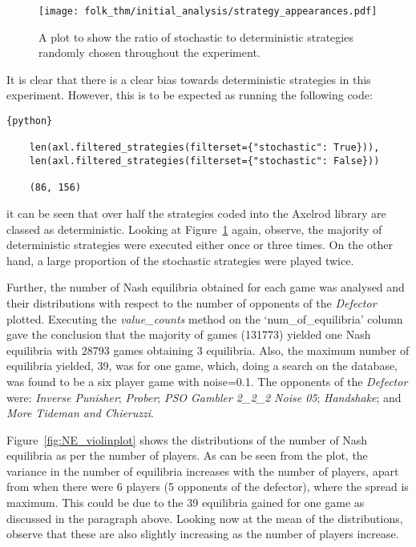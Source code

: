 \begin{figure}
    \centering
    \texttt{[image: folk\_thm/initial\_analysis/strategy\_appearances.pdf]}
    \caption{A plot to show the ratio of stochastic to deterministic strategies randomly chosen throughout the experiment.}\label{fig:stochastic_chart}
\end{figure}

It is clear that there is a clear bias towards deterministic strategies
in this experiment. However, this is to be expected as running the following
code:
\begin{verbatim}{python}
    
    len(axl.filtered_strategies(filterset={"stochastic": True})), 
    len(axl.filtered_strategies(filterset={"stochastic": False}))

    (86, 156)
\end{verbatim}
it can be seen that over half the strategies coded into the Axelrod library are
classed as deterministic. Looking at Figure~\ref{fig:stochastic_chart} again,
observe, the majority of deterministic strategies were executed either once or
three times. On the other hand, a large proportion of the stochastic strategies
were played twice.

Further, the number of Nash equilibria obtained for each game was analysed and
their distributions with respect to the number of opponents of the
\textit{Defector} plotted. Executing the \textit{value_counts} method on the
`num_of_equilibria' column gave the conclusion that the majority of games
(131773) yielded one Nash equilibria with 28793 games obtaining 3 equilibria.
Also, the maximum number of equilibria yielded, 39, was for one game, which,
doing a search on the database, was found to be a six player game with
noise=0.1. The opponents of the \textit{Defector} were: \textit{Inverse
Punisher}; \textit{Prober}; \textit{PSO Gambler 2\_2\_2 Noise 05};
\textit{Handshake}; and \textit{More Tideman and Chieruzzi}.

Figure~\ref{fig:NE_violinplot} shows the distributions of the number of Nash
equilibria as per the number of players. As can be seen from the plot, the
variance in the number of equilibria increases with the number of players, apart
from when there were 6 players (5 opponents of the defector), where the spread
is maximum. This could be due to the 39 equilibria gained for one game as
discussed in the paragraph above. Looking now at the mean of the distributions,
observe that these are also slightly increasing as the number of players
increase. 

